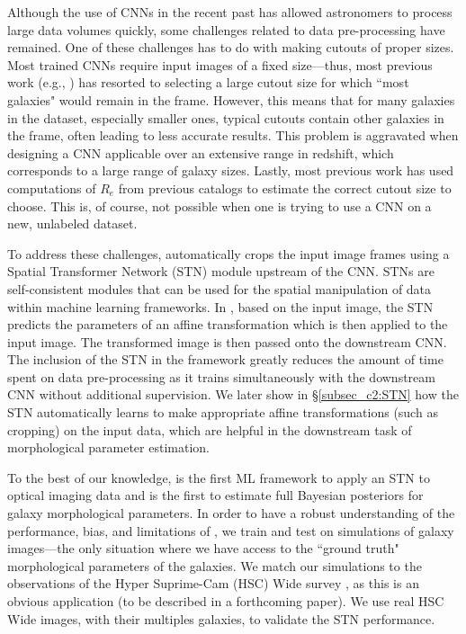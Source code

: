 Although the use of CNNs in the recent past has allowed astronomers to process large data volumes quickly, some challenges related to data pre-processing have remained. One of these challenges has to do with making cutouts of proper sizes. Most trained CNNs require input images of a fixed size---thus, most previous work (e.g., \citealp{Cheng2021GalaxyNetworks, Vega-Ferrero2021PushingSurvey}) has resorted to selecting a large cutout size for which ``most galaxies" would remain in the frame. However, this means that for many galaxies in the dataset, especially smaller ones, typical cutouts contain other galaxies in the frame, often leading to less accurate results. This problem is aggravated when designing a CNN applicable over an extensive range in redshift, which corresponds to a large range of galaxy sizes. Lastly, most previous work has used computations of $R_e$ from previous catalogs to estimate the correct cutout size to choose. This is, of course, not possible when one is trying to use a CNN on a new, unlabeled dataset. 

To address these challenges, \gampen{} automatically crops the input image frames using a Spatial Transformer Network (STN) module upstream of the CNN. STNs are self-consistent modules that can be used for the spatial manipulation of data within machine learning frameworks. In \gampen{}, based on the input image, the STN predicts the parameters of an affine transformation which is then applied to the input image. The transformed image is then passed onto the downstream CNN.
The inclusion of the STN in the framework greatly reduces the amount of time spent on data pre-processing as it trains simultaneously with the downstream CNN without additional supervision. We later show in \S \ref{subsec_c2:STN} how the STN automatically learns to make appropriate affine transformations (such as cropping) on the input data, which are helpful in the downstream task of morphological parameter estimation.

To the best of our knowledge, \gampen{} is the first ML framework to apply an STN to optical imaging data and is the first to estimate full Bayesian posteriors for galaxy morphological parameters. In order to have a robust understanding of the performance, bias, and limitations of \gampen{}, we train and test \gampen{} on simulations of galaxy images---the only situation where we have access to the ``ground truth" morphological parameters of the galaxies. We match our simulations to the observations of the Hyper Suprime-Cam (HSC) Wide survey \citep{hsc_pdr1}, as this is an obvious application (to be described in a forthcoming paper).
We use real HSC Wide images, with their multiples galaxies, to validate the STN performance.


